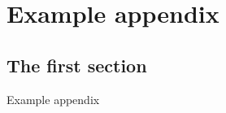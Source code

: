 \chapter{Example appendix}
\label{chap:appendix}
\chaptoc{}
\newpage

\section{The first section}
\label{sec:appsec1}

Example appendix

